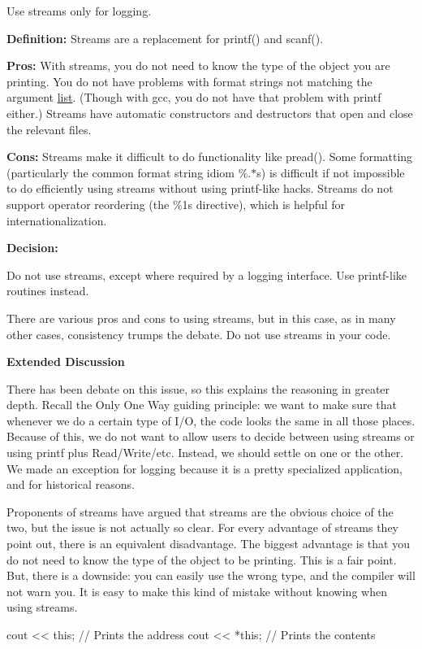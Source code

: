 Use streams only for logging.

{\bfseries Definition\+:} Streams are a replacement for printf() and scanf().

{\bfseries Pros\+:} With streams, you do not need to know the type of the object you are printing. You do not have problems with format strings not matching the argument \hyperlink{protocollist-p}{list}. (Though with gcc, you do not have that problem with printf either.) Streams have automatic constructors and destructors that open and close the relevant files.

{\bfseries Cons\+:} Streams make it difficult to do functionality like pread(). Some formatting (particularly the common format string idiom \%.$\ast$s) is difficult if not impossible to do efficiently using streams without using printf-\/like hacks. Streams do not support operator reordering (the \%1s directive), which is helpful for internationalization.

{\bfseries Decision\+:}

Do not use streams, except where required by a logging interface. Use printf-\/like routines instead.

There are various pros and cons to using streams, but in this case, as in many other cases, consistency trumps the debate. Do not use streams in your code.

{\bfseries Extended Discussion}

There has been debate on this issue, so this explains the reasoning in greater depth. Recall the Only One Way guiding principle\+: we want to make sure that whenever we do a certain type of I/O, the code looks the same in all those places. Because of this, we do not want to allow users to decide between using streams or using printf plus Read/\+Write/etc. Instead, we should settle on one or the other. We made an exception for logging because it is a pretty specialized application, and for historical reasons.

Proponents of streams have argued that streams are the obvious choice of the two, but the issue is not actually so clear. For every advantage of streams they point out, there is an equivalent disadvantage. The biggest advantage is that you do not need to know the type of the object to be printing. This is a fair point. But, there is a downside\+: you can easily use the wrong type, and the compiler will not warn you. It is easy to make this kind of mistake without knowing when using streams.


\begin{DoxyCode}
cout << \textcolor{keyword}{this};  \textcolor{comment}{// Prints the address}
cout << *\textcolor{keyword}{this};  \textcolor{comment}{// Prints the contents}
\end{DoxyCode}


